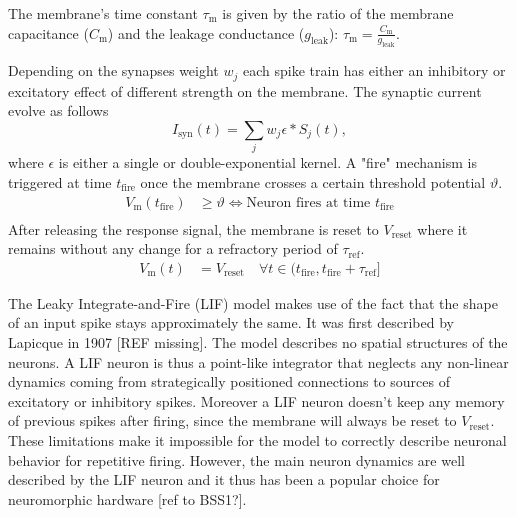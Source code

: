 The membrane's time constant $\tau_{\text{m}}$ is given by the ratio of the membrane capacitance ($C_{\text{m}}$) and the leakage conductance ($g_{\text{leak}}$): $\tau_{\text{m}} = \frac{C_{\text{m}}}{g_{\text{leak}}}$. 

Depending on the synapses weight $w_j$ each spike train has either an inhibitory or excitatory effect of different strength on the membrane. The synaptic current evolve as follows
 \begin{equation}
 I_{\text{syn}}(t) = \sum_j w_j \epsilon \ast S_j(t), 
 \end{equation}
where $\epsilon$ is either a single or double-exponential kernel. %
A "fire" mechanism is triggered at time $t_{\text{fire}}$ once the membrane crosses a certain threshold potential $\mathcal{\vartheta}$. 
\begin{align}
V_{\text{m}}(t_{\text{fire}}) &\ge \vartheta \Leftrightarrow \text{Neuron fires at time } t_{\text{fire}} \\
\end{align}
After releasing the response signal, the membrane is reset to $V_{\text{reset}}$ where it remains without any change for a refractory period of $\tau_{\text{ref}}$. 
\begin{align}
V_{\text{m}}(t) &= V_{\text{reset}} \quad \forall t \in (t_{\text{fire}}, t_{\text{fire}} + \tau_{\text{ref}}] 
\end{align}


The Leaky Integrate-and-Fire (LIF) model makes use of the fact that the shape of an input spike stays approximately the same. It was first described by Lapicque in 1907 [REF missing]. The model describes no spatial structures of the neurons. A LIF neuron is thus a point-like integrator that neglects any non-linear dynamics coming from strategically positioned connections to sources of excitatory or inhibitory spikes. Moreover a LIF neuron doesn't keep any memory of previous spikes after firing, since the membrane will always be reset to $V_{\text{reset}}$. These limitations make it impossible for the model to correctly describe neuronal behavior for repetitive firing. However, the main neuron dynamics are well described by the LIF neuron and it thus has been a popular choice for neuromorphic hardware [ref to BSS1?].\\

